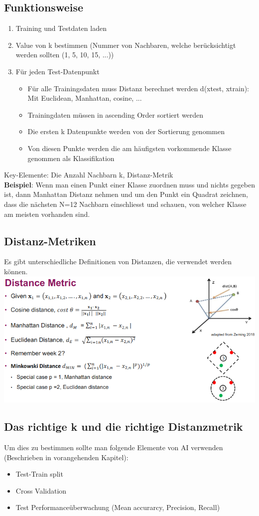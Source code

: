 \subsection{Funktionsweise}
\begin{enumerate}
\item Training und Testdaten laden
\item Value von k bestimmen (Nummer von Nachbaren, welche berücksichtigt werden sollten (1, 5, 10, 15, ...))
\item Für jeden Test-Datenpunkt
\begin{itemize}
\item Für alle Trainingsdaten muss Distanz berechnet werden d(xtest, xtrain): Mit Euclidean, Manhattan, cosine, ...
\item Trainingdaten müssen in ascending Order sortiert werden
\item Die ersten k Datenpunkte werden von der Sortierung genommen
\item Von diesen Punkte werden die am häufigsten vorkommende Klasse genommen als Klassifikation
\end{itemize}
\end{enumerate}
Key-Elemente: Die Anzahl Nachbarn k, Distanz-Metrik\\
\textbf{Beispiel}: Wenn man einen Punkt einer Klasse zuordnen muss und nichts gegeben ist, dann Manhattan Distanz nehmen und um den Punkt ein Quadrat zeichnen, dass  die nächsten N=12 Nachbarn einschliesst und schauen, von welcher Klasse am meisten vorhanden sind.
\subsection{Distanz-Metriken}
Es gibt unterschiedliche Definitionen von Distanzen, die verwendet werden können.
\includegraphics[width=\linewidth]{img/distance_metric.png}
\subsection{Das richtige k und die richtige Distanzmetrik}
Um dies zu bestimmen sollte man folgende Elemente von AI verwenden (Beschrieben in vorangehenden Kapitel):
\begin{itemize}
\item Test-Train split
\item Cross Validation
\item Test Performanceüberwachung (Mean accurarcy, Precision, Recall)
\end{itemize}

